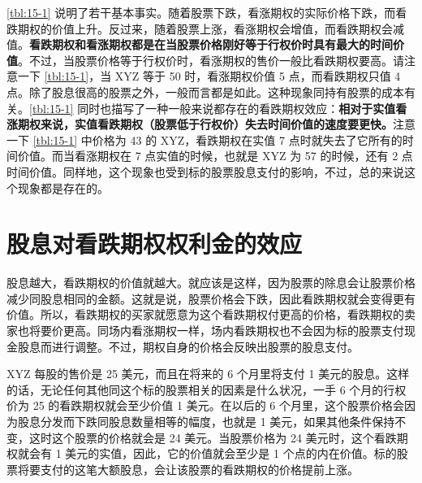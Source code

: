 \autoref{tbl:15-1} 说明了若干基本事实。随着股票下跌，看涨期权的实际价格下跌，而看跌期权的价值上升。反过来，随着股票上涨，看涨期权会增值，而看跌期权会减值。\textbf{看跌期权和看涨期权都是在当股票价格刚好等于行权价时具有最大的时间价值}。不过，当股票价格等于行权价时，看涨期权的售价一般比看跌期权要高。请注意一下 \autoref{tbl:15-1}，当 XYZ 等于 50 时，看涨期权价值 5 点，而看跌期权只值 4 点。除了股息很高的股票之外，一般而言都是如此。这种现象同持有股票的成本有关。\autoref{tbl:15-1} 同时也描写了一种一般来说都存在的看跌期权效应：\textbf{相对于实值看涨期权来说，实值看跌期权（股票低于行权价）失去时间价值的速度要更快。}注意一下 \autoref{tbl:15-1} 中价格为 43 的 XYZ，看跌期权在实值 7 点时就失去了它所有的时间价值。而当看涨期权在 7 点实值的时候，也就是 XYZ 为 57 的时候，还有 2 点时间价值。同样地，这个现象也受到标的股票股息支付的影响，不过，总的来说这个现象都是存在的。
\section{股息对看跌期权权利金的效应}
股息越大，看跌期权的价值就越大。就应该是这样，因为股票的除息会让股票价格减少同股息相同的金额。这就是说，股票价格会下跌，因此看跌期权就会变得更有价值。所以，看跌期权的买家就愿意为这个看跌期权付更高的价格，看跌期权的卖家也将要价更高。同场内看涨期权一样，场内看跌期权也不会因为标的股票支付现金股息而进行调整。不过，期权自身的价格会反映出股票的股息支付。
\begin{tcolorbox}
    XYZ 每股的售价是 25 美元，而且在将来的 6 个月里将支付 1 美元的股息。这样的话，无论任何其他同这个标的股票相关的因素是什么状况，一手 6 个月的行权价为 25 的看跌期权就会至少价值 1 美元。在以后的 6 个月里，这个股票价格会因为股息分发而下跌同股息数量相等的幅度，也就是 1 美元，如果其他条件保持不变，这时这个股票的价格就会是 24 美元。当股票价格为 24 美元时，这个看跌期权就会有 1 美元的实值，因此，它的价值就会至少是 1 个点的内在价值。标的股票将要支付的这笔大额股息，会让该股票的看跌期权的价格提前上涨。
\end{tcolorbox}
